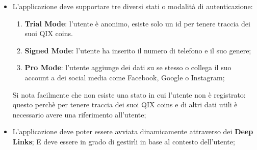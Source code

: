 \begin{itemize}
{        Tale gravità finirà con la fine dell'animazione o l'apparizione della nuova pagina;
    }
    \item {
        L'applicazione deve supportare tre diversi stati o modalità di autenticazione:
        \begin{enumerate}
            \item\textbf{Trial Mode}: l'utente è anonimo, esiste solo un id per tenere traccia dei suoi QIX coins.
            \item\textbf{Signed Mode}: l'utente ha inserito il numero di telefono e il suo genere;
            \item \textbf{Pro Mode}: l'utente aggiunge dei dati su se stesso o collega il suo account a dei social media come Facebook, Google o Instagram;
        \end{enumerate}
        Si nota facilmente che non esiste una stato in cui l'utente non è registrato: questo perchè
        per tenere traccia dei suoi QIX coins e di altri dati utili è necessario avere una riferimento all'utente;
    }
    \item {
        L'applicazione deve poter essere avviata dinamicamente
        attraverso dei \textbf{Deep Links}\cite{deeplinks};
        E deve essere in grado di gestirli in base al contesto dell'utente;
    }
\end{itemize}